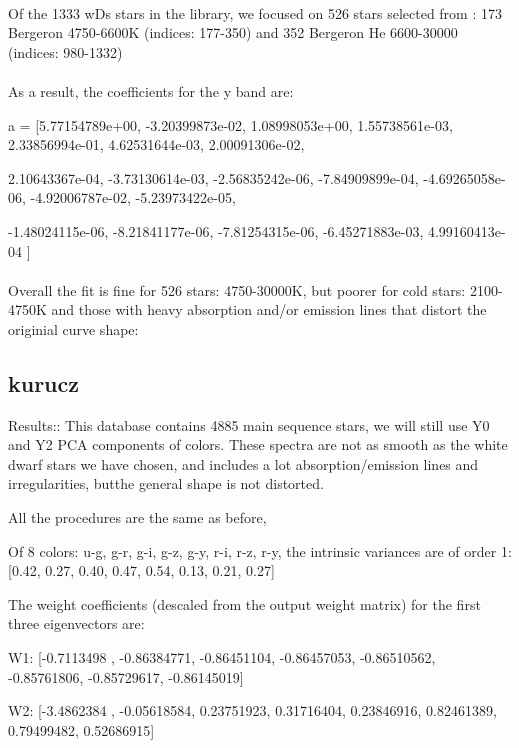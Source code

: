 \paragraph{}
Of the 1333 wDs stars in the library, we focused on 526 stars selected from : 173 Bergeron 4750-6600K (indices: 177-350) and 352 Bergeron He 6600-30000 
(indices: 980-1332)
\paragraph{}
As a result, the coefficients for the y band are:

a = [5.77154789e+00,  -3.20399873e-02,   1.08998053e+00,   1.55738561e-03,   2.33856994e-01,   4.62531644e-03,  2.00091306e-02,   

2.10643367e-04,  -3.73130614e-03,  -2.56835242e-06,  -7.84909899e-04,  -4.69265058e-06,  -4.92006787e-02,  -5.23973422e-05,  

-1.48024115e-06,  -8.21841177e-06,  -7.81254315e-06,  -6.45271883e-03,  4.99160413e-04 ]

\paragraph{}
Overall the fit is fine for 526 stars: 4750-30000K, but poorer for cold stars: 2100-4750K and those with heavy absorption and/or emission lines that distort the originial curve shape:


\clearpage
\subsection{kurucz}
Results::
This database contains 4885 main sequence stars, we will still use Y0 and Y2 PCA components of colors. These spectra are not as smooth as the white dwarf stars we have chosen, and includes a lot absorption/emission lines and irregularities, butthe general shape is not distorted.

All the procedures are the same as before,

Of 8 colors: u-g, g-r, g-i, g-z, g-y, r-i, r-z, r-y, the intrinsic variances are of order 1: [0.42, 0.27, 0.40, 0.47, 0.54, 0.13, 0.21, 0.27]

The weight coefficients (descaled from the output weight matrix) for the first three eigenvectors  are:


W1:  [-0.7113498 , -0.86384771, -0.86451104, -0.86457053, -0.86510562,  -0.85761806, -0.85729617, -0.86145019]


W2:  [-3.4862384 , -0.05618584,  0.23751923,  0.31716404,  0.23846916,  0.82461389,  0.79499482,  0.52686915]



